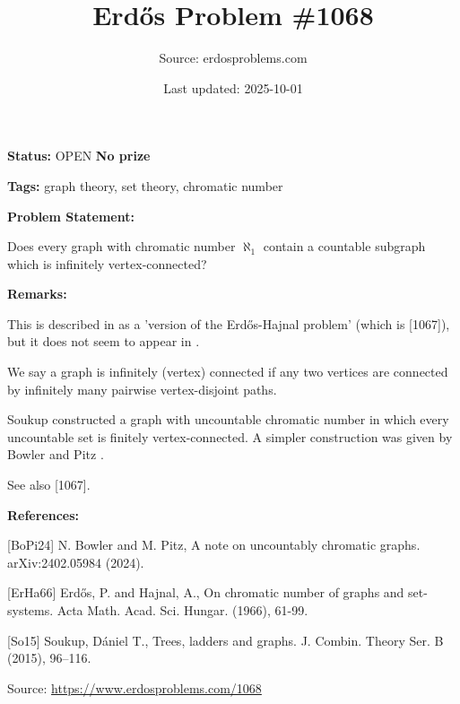 \documentclass{article}
\title{Erd\H{o}s Problem \#1068}
\date{Last updated: 2025-10-01}
\author{Source: erdosproblems.com}
\begin{document}
\maketitle

\noindent\textbf{Status:} OPEN \quad \textbf{No prize}

\noindent\textbf{Tags:} graph theory, set theory, chromatic number

\medskip
\noindent\textbf{Problem Statement:}

Does every graph with chromatic number $\aleph_1$ contain a countable subgraph which is infinitely vertex-connected?

\bigskip
\noindent\textbf{Remarks:}

This is described in \cite{BoPi24} as a 'version of the Erd\H{o}s-Hajnal problem' (which is [1067]), but it does not seem to appear in \cite{ErHa66}.

We say a graph is infinitely (vertex) connected if any two vertices are connected by infinitely many pairwise vertex-disjoint paths.

Soukup \cite{So15} constructed a graph with uncountable chromatic number in which every uncountable set is finitely vertex-connected. A simpler construction was given by Bowler and Pitz \cite{BoPi24}.

See also [1067].

\bigskip
\noindent\textbf{References:}

[BoPi24] N. Bowler and M. Pitz, A note on uncountably chromatic graphs. arXiv:2402.05984 (2024).
 
 [ErHa66] Erd\H{o}s, P. and Hajnal, A., On chromatic number of graphs and set-systems. Acta Math. Acad. Sci. Hungar. (1966), 61-99.
 
 [So15] Soukup, D\'{a}niel T., Trees, ladders and graphs. J. Combin. Theory Ser. B (2015), 96--116.

\bigskip
\noindent\small{Source: \url{https://www.erdosproblems.com/1068}}
\end{document}
